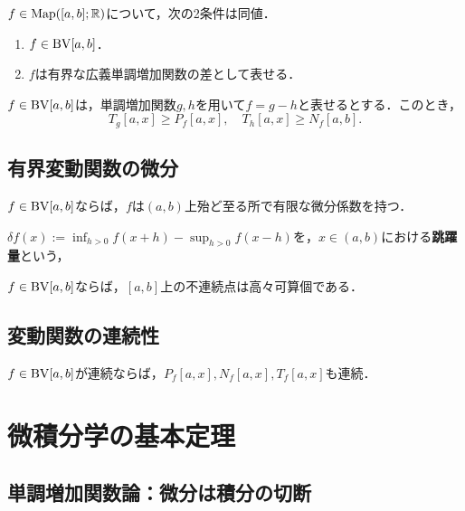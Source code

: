 \documentclass[uplatex, dvipdfmx]{jsreport}
\begin{document}
\begin{corollary}[有界変動関数の特徴付け]
    $f\in\mathrm{Map}([a,b];\mathbb{R})$について，次の2条件は同値．
    \begin{enumerate}
        \item $f\in\mathrm{BV}[a,b]$．
        \item $f$は有界な広義単調増加関数の差として表せる．
    \end{enumerate}
\end{corollary}

\begin{corollary}
    $f\in\mathrm{BV}[a,b]$は，単調増加関数$g,h$を用いて$f=g-h$と表せるとする．このとき，
    \[T_g[a,x]\ge P_f[a,x],\quad T_h[a,x]\ge N_f[a,b].\]
\end{corollary}

\subsection{有界変動関数の微分}

\begin{theorem}[Lebesgue]
    $f\in\mathrm{BV}[a,b]$ならば，$f$は$(a,b)$上殆ど至る所で有限な微分係数を持つ．
\end{theorem}

\begin{definition}[saltus]
    $\delta f(x):=\inf_{h>0}f(x+h)-\sup_{h>0}f(x-h)$を，$x\in(a,b)$における\textbf{跳躍量}という，
\end{definition}

\begin{theorem}
    $f\in\mathrm{BV}[a,b]$ならば，$[a,b]$上の不連続点は高々可算個である．
\end{theorem}

\subsection{変動関数の連続性}

\begin{theorem}
    $f\in\mathrm{BV}[a,b]$が連続ならば，$P_f[a,x],N_f[a,x],T_f[a,x]$も連続．
\end{theorem}

\section{微積分学の基本定理}

\subsection{単調増加関数論：微分は積分の切断}
\end{document}
